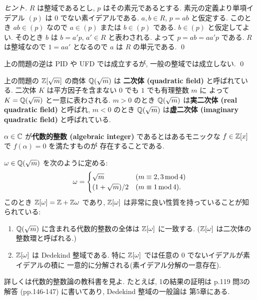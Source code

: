 \documentclass[12pt,twoside]{jarticle}
\begin{document}
\begin{proof}[ヒント]
 $R$ は整域であるとし, $p$ はその素元であるとする. %
 素元の定義より単項イデアル $(p)$ は $0$ でない素イデアルである. 
 $a,b\in R$, $p=ab$ と仮定する.
 このとき $ab\in (p)$ なので $a\in(p)$ または $b\in(p)$ である.
 $b\in (p)$ と仮定してよい.
 そのとき $b$ は $b=a'p$, $a'\in R$ と表わされる. 
 よって $p=ab=aa'p$ である. 
 $R$ は整域なので $1=aa'$ となるので $a$ は $R$ の単元である.
 \qed
\end{proof}

\begin{rem}
 上の問題の逆は PID や UFD では成立するが, 一般の整域では成立しない.
 \qed
\end{rem}

\begin{guide}[二次体の整数環]
 上の問題の ${\mathbb Z}[\sqrt{m}]$ の商体 ${\mathbb Q}(\sqrt{m})$ は
 {\bf 二次体 (quadratic field)} と呼ばれている.
 二次体 $K$ は平方因子を含まない $0$ でも $1$ でも有理整数 $m$ に
 よって $K={\mathbb Q}(\sqrt{m})$ と一意に表わされる.
 $m>0$ のとき ${\mathbb Q}(\sqrt{m})$ は{\bf 実二次体 (real quadratic field)} 
 と呼ばれ, %
 $m<0$ のとき ${\mathbb Q}(\sqrt{m})$ は{\bf 虚二次体 (imaginary quadratic field)}
 と呼ばれている.

 $\alpha\in{\mathbb C}$ が{\bf 代数的整数 (algebraic integer)} 
 であるとはあるモニックな $f\in{\mathbb Z}[x]$ で $f(\alpha)=0$ を満たすものが
 存在することである.  

 $\omega\in{\mathbb Q}(\sqrt{m})$ を次のように定める:
 \begin{equation*}
  \omega = 
  \begin{cases}
   \sqrt{m}       & (m\equiv 2,3 \mathop{\mathrm{mod}}\nolimits 4) \\
   (1+\sqrt{m})/2 & (m\equiv 1 \mathop{\mathrm{mod}}\nolimits 4).  \\
  \end{cases}
 \end{equation*}
 このとき ${\mathbb Z}[\omega]={\mathbb Z}+{\mathbb Z}\omega$ であり, 
 ${\mathbb Z}[\omega]$ は非常に良い性質を持っていることが知られている:
 \begin{enumerate}
  \item ${\mathbb Q}(\sqrt{m})$ に含まれる代数的整数の全体は
   ${\mathbb Z}[\omega]$ に一致する.
   (${\mathbb Z}[\omega]$ は二次体の整数環と呼ばれる.)
  \item ${\mathbb Z}[\omega]$ は Dedekind 整域である.
   特に ${\mathbb Z}[\omega]$ では任意の $0$ でないイデアルが素イデアルの積に
   一意的に分解される(素イデアル分解の一意存在).
 \end{enumerate}
 詳しくは代数的整数論の教科書を見よ. 
 たとえば, 1の結果の証明は\cite{suron-1} p.119 問3の解答 (pp.146-147) 
 に書いてあり, 
 Dedekind 整域の一般論は \cite{kan-to-tai-1} 第5章にある.


\end{guide}
\end{document}
